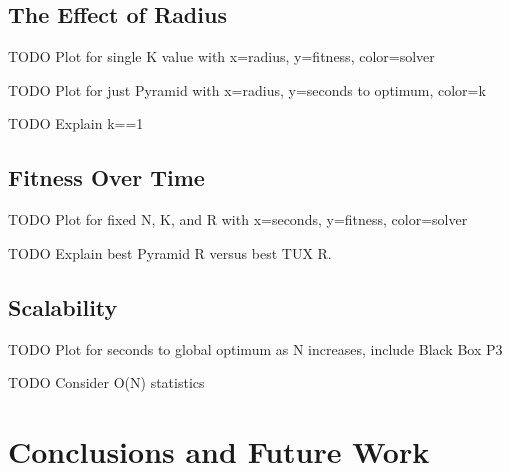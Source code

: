 \documentclass{sig-alternate}
\begin{document}
\subsection{The Effect of Radius}
TODO Plot for single K value with x=radius, y=fitness, color=solver

TODO Plot for just Pyramid with x=radius, y=seconds to optimum, color=k

TODO Explain k==1

\subsection{Fitness Over Time}
TODO Plot for fixed N, K, and R with x=seconds, y=fitness, color=solver

TODO Explain best Pyramid R versus best TUX R.

\subsection{Scalability}
TODO Plot for seconds to global optimum as N increases, include Black Box P3

TODO Consider O(N) statistics

\section{Conclusions and Future Work}
%

%
%
\balancecolumns
\end{document}
